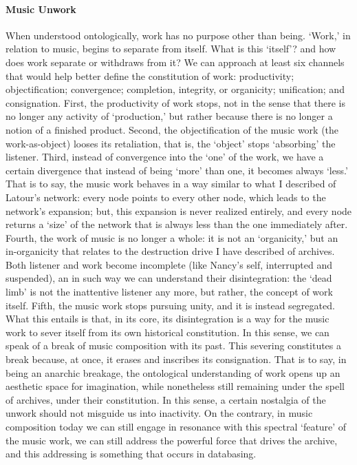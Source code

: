 \paragraph{Music Unwork}
When understood ontologically, work has no purpose other than being. `Work,' in relation to music, begins to separate from itself. What is this `itself'? and how does work separate or withdraws from it? We can approach at least six channels that would help better define the constitution of work: productivity; objectification; convergence; completion, integrity, or organicity; unification; and consignation. First, the productivity of work stops, not in the sense that there is no longer any activity of `production,' but rather because there is no longer a notion of a finished product. Second, the objectification of the music work (the work-as-object) looses its retaliation, that is, the `object' stops `absorbing' the listener. Third, instead of convergence into the `one' of the work, we have a certain divergence that instead of being `more' than one, it becomes always `less.' That is to say, the music work behaves in a way similar to what I described of Latour's network: every node points to every other node, which leads to the network's expansion; but, this expansion is never realized entirely, and every node returns a `size' of the network that is always less than the one immediately after. Fourth, the work of music is no longer a whole: it is not an `organicity,' but an in-organicity that relates to the destruction drive I have described of archives. Both listener and work become incomplete (like Nancy's self, interrupted and suspended), an in such way we can understand their disintegration: the `dead limb' is not the inattentive listener any more, but rather, the concept of work itself. Fifth, the music work stops pursuing unity, and it is instead segregated. What this entails is that, in its core, its disintegration is a way for the music work to sever itself from its own historical constitution. In this sense, we can speak of a break of music composition with its past. This severing constitutes a break because, at once, it erases and inscribes its consignation. That is to say, in being an anarchic breakage, the ontological understanding of work opens up an aesthetic space for imagination, while nonetheless still remaining under the spell of archives, under their constitution. In this sense, a certain nostalgia of the unwork should not misguide us into inactivity. On the contrary, in music composition today we can still engage in resonance with this spectral `feature' of the music work, we can still address the powerful force that drives the archive, and this addressing is something that occurs in databasing.

